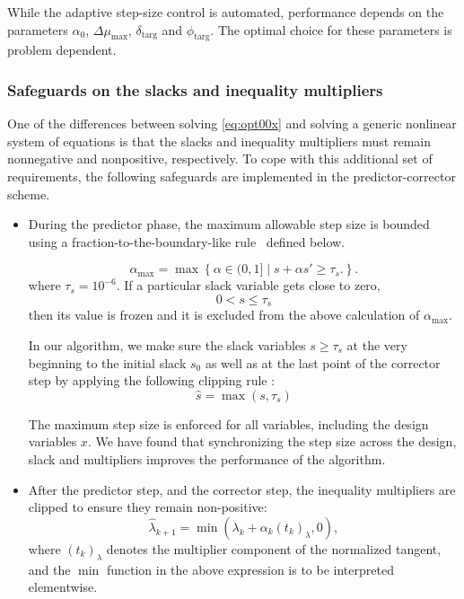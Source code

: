 \begin{remark}
  While the adaptive step-size control is automated, performance depends on the
  parameters $\alpha_0$, $\Delta \mu_{\max}$, $\delta_{\text{targ}}$ and
  $\phi_{\text{targ}}$.  The optimal choice for these parameters is problem
  dependent.
\end{remark}

\subsubsection{Safeguards on the slacks and inequality multipliers}\label{sec:fraction}
One of the differences between solving \eqref{eq:opt00x} and solving a generic
nonlinear system of equations is that the slacks and inequality multipliers must
remain nonnegative and nonpositive, respectively.  To cope with this additional
set of requirements, the following safeguards are implemented in the
predictor-corrector scheme.
\begin{itemize}
  \item During the predictor phase, the maximum allowable step size is bounded
    using a fraction-to-the-boundary-like rule~\cite{Nocedal2006NO} defined
    below.
    
  \begin{equation}\label{eq:f2b}
      \alpha_{\max} = \max\left\{
      \alpha \in (0,1] \;|\; s + \alpha s' \geq \tau_s .\right\}.
    \end{equation}
where $\tau_s = 10^{-6}$. If a particular slack variable gets close to zero, 
   \begin{equation*}
   0 <  s \leq \tau_s
   \end{equation*}
  then its value is frozen and it is excluded from the above
    calculation of $\alpha_{\max}$.

In our algorithm, we make sure the slack variables $s \geq \tau_s$ at the very beginning 
to the initial slack $s_0$ as well as at the last point of the corrector step 
by applying the following clipping rule : 
   \begin{equation}\label{eq:sclip}
      \hat{s} = \max(s, \tau_s)
   \end{equation}


    The maximum step size is enforced for all variables, including the design
    variables $x$.  We have found that synchronizing the step size across the
    design, slack and multipliers improves the performance of the algorithm.
    
  \item After the predictor step, and the corrector step,
  the inequality multipliers are clipped to
    ensure they remain non-positive:
    \begin{equation}\label{eq:lclip}
      \hat{\lambda}_{k+1} = \min(\lambda_{k} + \alpha_k (t_k)_{\lambda}, 0),
    \end{equation}
    where $(t_k)_{\lambda}$ denotes the multiplier component of the normalized
    tangent, and the $\min$ function in the above expression is to be
    interpreted elementwise.
    
\end{itemize}

